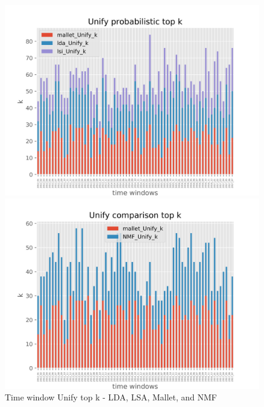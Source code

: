 \begin{figure}[!ht]
  \centering
  \begin{minipage}[b]{0.45\textwidth}
    \includegraphics[width=\textwidth]{img/Unify_probabilistic_top_k_all_topK_plot.png}
  \end{minipage}
  \hfill
  \begin{minipage}[b]{0.45\textwidth}
    \includegraphics[width=\textwidth]{img/Unify_comparison_top_k_all_topK_plot.png}
  \end{minipage}
  \caption{Time window Unify top k - LDA, LSA, Mallet, and NMF }
  \label{fig:window_Unify_k_all}
\end{figure}




